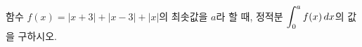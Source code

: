 함수 $f(x)=|x+3|+|x-3|+|x|$의 최솟값을 $a$라 할 때, 정적분 $\displaystyle\int_{0}^{a} f(x)\mkern3mu dx$의 값을 구하시오.
